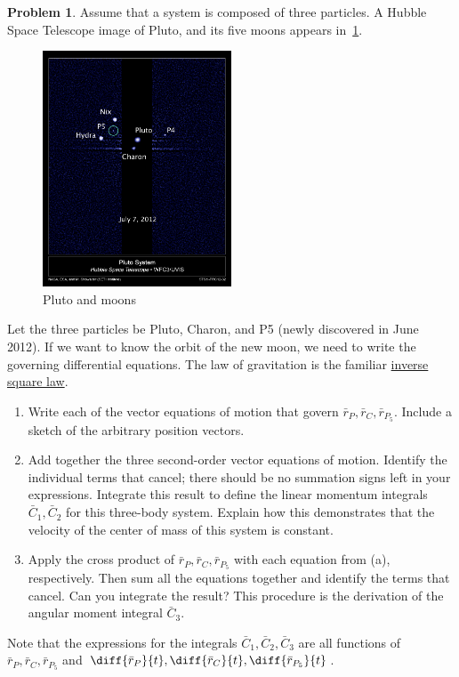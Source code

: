 \documentclass[10pt]{article}
\theoremstyle{definition}
\newtheorem{prob}{Problem}[section]
\newenvironment{subprob}%
{\renewcommand{\theenumi}{\alph{enumi}}\renewcommand{\labelenumi}{(\theenumi)}\begin{enumerate}}%
{\end{enumerate}}%
\begin{document}
\begin{prob}
    Assume  that  a system is composed of three particles.
    A Hubble Space Telescope image of Pluto, and its five moons appears in~\cref{fig:pluto}.
    \begin{figure}[htbp]
        \centering
        \includegraphics[trim={10cm 50cm 10cm 20cm},clip,width=0.5\textwidth]{figures/pluto.jpg}
        \caption{Pluto and moons~\label{fig:pluto}}
    \end{figure}
    Let the three particles be Pluto, Charon, and P5 (newly discovered in June 2012).
    If we want to know the orbit of the new moon, we need to write the governing differential equations.
    The law of gravitation is the familiar \underline{inverse square law}.

    \begin{subprob}
        \item Write each of the vector equations of motion that govern \( \bar r_P, \bar r_C, \bar r_{P_5} \).
            Include a sketch of the arbitrary position vectors.
        \item Add together the three second-order vector equations of motion. 
            Identify the individual terms that cancel; there should be no summation signs left in your expressions.
            Integrate this result to define the linear momentum integrals \( \bar C_1 , \bar C_2 \) for this three-body  system.
            Explain how this demonstrates that the velocity of the center of mass of this system is constant.
        \item Apply the cross product of \( \bar r_P, \bar r_C, \bar r_{P_5} \) with each equation from (a), respectively. 
            Then sum all the equations together and identify the terms that cancel. 
            Can you integrate the result?
            This procedure is the derivation of the angular moment integral \( \bar C_3\).
    \end{subprob}

    Note that the expressions for the integrals \( \bar C_1, \bar C_2, \bar C_3 \) are all functions of \( \bar r_P, \bar r_C, \bar r_{P_5} \) and \( \diff{\bar r_P}{t}, \diff{\bar r_C}{t}, \diff{\bar r_{P_5}}{t}\).
\end{prob}
\end{document}
